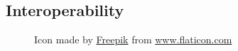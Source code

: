 \subsection{Interoperability}
\label{subsec:introduction_principles_interoperability}

\begin{figure} %
  \centering
  \def\stackalignment{l} %
  {\scriptsize \parbox[t]{\linewidth}{ Icon made by \href{https://www.flaticon.com/authors/freepik}{Freepik} from \href{http://www.flaticon.com}{www.flaticon.com} }}
\end{figure}

